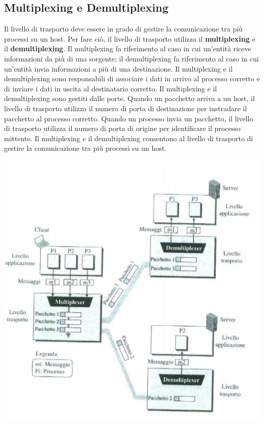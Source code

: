 \documentclass[12pt]{report}
\begin{document}
	\subsection{Multiplexing e Demultiplexing}
	Il livello di trasporto deve essere in grado di gestire la comunicazione tra più processi su un host. Per fare ciò, il livello di trasporto utilizza il \textbf{multiplexing} e il \textbf{demultiplexing}. Il multiplexing fa riferimento al caso in cui un'entità riceve informazioni da più di una sorgente; il demultiplexing fa riferimento al caso in cui un'entità invia informazioni a più di una destinazione. Il multiplexing e il demultiplexing sono responsabili di associare i dati in arrivo al processo corretto e di inviare i dati in uscita al destinatario corretto. Il multiplexing e il demultiplexing sono gestiti dalle porte. Quando un pacchetto arriva a un host, il livello di trasporto utilizza il numero di porta di destinazione per instradare il pacchetto al processo corretto. Quando un processo invia un pacchetto, il livello di trasporto utilizza il numero di porta di origine per identificare il processo mittente. Il multiplexing e il demultiplexing consentono al livello di trasporto di gestire la comunicazione tra più processi su un host.
	\begin{center}
		\includegraphics[scale=0.5]{assets/multipl-demultipl.png}
	\end{center}
\end{document}

